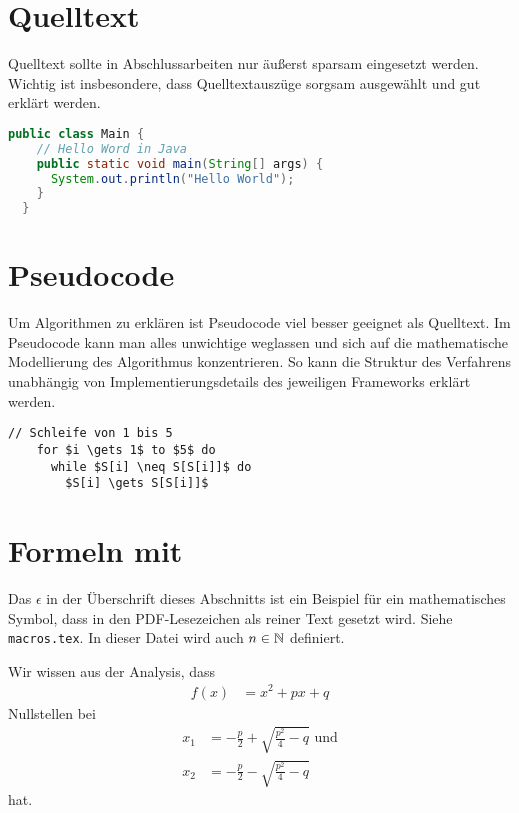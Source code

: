 \section{Quelltext}

Quelltext sollte in Abschlussarbeiten nur äußerst sparsam eingesetzt werden. Wichtig ist insbesondere, dass Quelltextauszüge sorgsam ausgewählt und gut erklärt werden.

\begin{lstlisting}[language=Java,gobble=2]
  public class Main {
    // Hello Word in Java
    public static void main(String[] args) {
      System.out.println("Hello World");
    }
  }
\end{lstlisting}

\section{Pseudocode}

Um Algorithmen zu erklären ist Pseudocode viel besser geeignet als Quelltext. Im Pseudocode kann man alles unwichtige weglassen und sich auf die mathematische Modellierung des Algorithmus konzentrieren. So kann die Struktur des Verfahrens unabhängig von Implementierungsdetails des jeweiligen Frameworks erklärt werden.

\begin{lstlisting}[style=pseudo,gobble=2]
  // Schleife von 1 bis 5
    for $i \gets 1$ to $5$ do
      while $S[i] \neq S[S[i]]$ do
        $S[i] \gets S[S[i]]$
\end{lstlisting}

\section{Formeln mit \pdfepsilon}

Das $\epsilon$ in der Überschrift dieses Abschnitts ist ein Beispiel für ein mathematisches Symbol, dass in den PDF-Lesezeichen als reiner Text gesetzt wird. Siehe \texttt{macros.tex}. In dieser Datei wird auch $n \in \mathbb{N}$ definiert.

Wir wissen aus der Analysis, dass
\begin{align}
  f(x) &= x^2 + px + q
\end{align}
Nullstellen bei
\begin{align}
  x_1 &= -\frac p2 + \sqrt{\frac{p^2}4 - q} \text{ und}\\
  x_2 &= -\frac p2 - \sqrt{\frac{p^2}4 - q}
\end{align}
hat.


